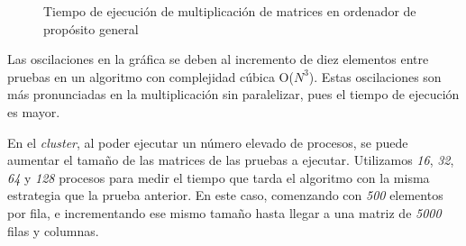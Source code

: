 \begin{figure}[!h]
	\centering
	\caption{Tiempo de ejecución de multiplicación de matrices en ordenador de propósito general}
	\label{fig:mult_matrices}
\end{figure}



\newpage

Las oscilaciones en la gráfica se deben al incremento de diez elementos entre pruebas en un algoritmo con complejidad cúbica O($N^{3}$). Estas oscilaciones son más pronunciadas en la multiplicación sin paralelizar, pues el tiempo de ejecución es mayor.

En el \textit{cluster}, al poder ejecutar un número elevado de procesos, se puede aumentar el tamaño de las matrices de las pruebas a ejecutar. Utilizamos \textit{16}, \textit{32}, \textit{64} y \textit{128} procesos para medir el tiempo que tarda el algoritmo con la misma estrategia que la prueba anterior. En este caso, comenzando con \textit{500} elementos por fila, e incrementando ese mismo tamaño hasta llegar a una matriz de \textit{5000} filas y columnas. 


